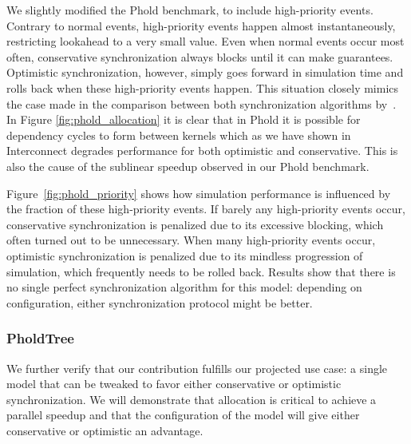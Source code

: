 We slightly modified the Phold benchmark, to include high-priority events.
Contrary to normal events, high-priority events happen almost instantaneously, restricting lookahead to a very small value.
Even when normal events occur most often, conservative synchronization always blocks until it can make guarantees.
Optimistic synchronization, however, simply goes forward in simulation time and rolls back when these high-priority events happen.
This situation closely mimics the case made in the comparison between both synchronization algorithms by~\cite{FujimotoBook}.
In Figure \ref{fig:phold_allocation} it is clear that in Phold it is possible for dependency cycles to form between kernels which as we have shown in Interconnect degrades performance for both optimistic and conservative. This is also the cause of the sublinear speedup observed in our Phold benchmark.

Figure~\ref{fig:phold_priority} shows how simulation performance is influenced by the fraction of these high-priority events.
If barely any high-priority events occur, conservative synchronization is penalized due to its excessive blocking, which often turned out to be unnecessary.
When many high-priority events occur, optimistic synchronization is penalized due to its mindless progression of simulation, which frequently needs to be rolled back.
Results show that there is no single perfect synchronization algorithm for this model: depending on configuration, either synchronization protocol might be better.


\subsubsection{PholdTree}
We further verify that our contribution fulfills our projected use case: a single model that can be tweaked to favor either conservative or optimistic synchronization. We will demonstrate that allocation is critical to achieve a parallel speedup and that the configuration of the model will give either conservative or optimistic an advantage.
